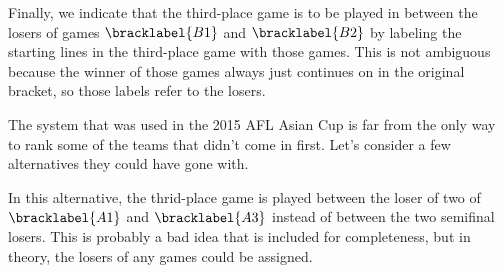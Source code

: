 {    Finally, we indicate that the third-place game is to be played in between the losers of games $\bracklabel{B1}$ and $\bracklabel{B2}$ by labeling the starting lines in the third-place game with those games. This is not ambiguous because the winner of those games always just continues on in the original bracket, so those labels refer to the losers.

    The system that was used in the 2015 AFL Asian Cup is far from the only way to rank some of the teams that didn't come in first. Let's consider a few alternatives they could have gone with.


    In this alternative, the thrid-place game is played between the loser of two of $\bracklabel{A1}$ and $\bracklabel{A3}$ instead of between the two semifinal losers. This is probably a bad idea that is included for completeness, but in theory, the losers of any games could be assigned.
}